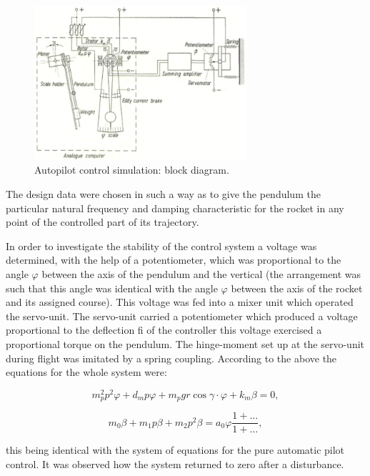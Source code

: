 \documentclass[12pt, a4paper]{article}
\begin{document}
\begin{figure}[ht]
  \centering
  \includegraphics[width=0.7\textwidth]{figs/ctrl-12.png}
  \caption{Autopilot control simulation: block diagram.}
  \label{fig:12}
\end{figure}

The design data were chosen in such a way as to give the pendulum the particular natural frequency and damping characteristic for the rocket in any point of the controlled part of its trajectory.

In order to investigate the stability of the control system a voltage was determined, with the help of a potentiometer, which was proportional to the angle $\varphi$ between the axis of the pendulum and the vertical (the arrangement was such that this angle was identical with the angle $\varphi$ between the axis of the rocket and its assigned course). This voltage was fed into a mixer unit which operated the servo-unit. The servo-unit carried a potentiometer which produced a voltage proportional to the deflection fi of the controller this voltage exercised a proportional torque on the pendulum. The hinge-moment set up at the servo-unit during flight was imitated by a spring coupling. According to the above the equations for the whole system were:

\begin{equation}
  m_{p}^{2}p^{2}\varphi+d_{m}p\varphi+m_{p}gr\cos{\gamma}\cdot{\varphi}+k_{m}\beta=0,
\end{equation}

\begin{equation}
  m_{0}\beta+m_{1}p\beta+m_{2}p^{2}\beta=a_{0}\varphi\frac{1+\hdots}{1+\hdots},
\end{equation}

this being identical with the system of equations for the pure automatic pilot control. It was observed how the system returned to zero after a disturbance.
\end{document}

